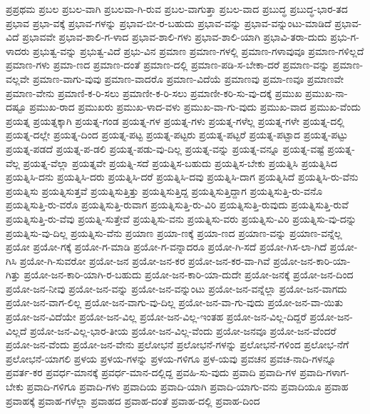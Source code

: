 {ಪ್ರಪ್ರಥಮ
ಪ್ರಬಲ
ಪ್ರಬಲ-ವಾಗಿ
ಪ್ರಬಲವಾ-ಗಿ-ರುವ
ಪ್ರಬಲ-ವಾಗುತ್ತಾ
ಪ್ರಬಲ-ವಾದ
ಪ್ರಬುದ್ಧ
ಪ್ರಬುದ್ಧ-ಭಾರ-ತದ
ಪ್ರಭಾವ
ಪ್ರಭಾ-ವಕ್ಕೆ
ಪ್ರಭಾವ-ಗಳನ್ನು
ಪ್ರಭಾವ-ಬೀ-ರ-ಬಹುದು
ಪ್ರಭಾವ-ವನ್ನು
ಪ್ರಭಾವ-ವನ್ನುಂಟು-ಮಾಡಿದೆ
ಪ್ರಭಾವ-ವಿದೆ
ಪ್ರಭಾವವೇ
ಪ್ರಭಾವ-ಶಾಲಿ-ಗ-ಳಾದ
ಪ್ರಭಾವ-ಶಾಲಿ-ಗಳು
ಪ್ರಭಾವ-ಶಾಲಿ-ಯಾಗಿ
ಪ್ರಭಾವಿ-ತರಾ-ದುದು
ಪ್ರಭು-ಗ-ಳಾದರು
ಪ್ರಭುತ್ವ-ವನ್ನು
ಪ್ರಭುತ್ವ-ವಿದೆ
ಪ್ರಭು-ವಿನ
ಪ್ರಮಾಣ
ಪ್ರಮಾಣ-ಗಳಲ್ಲಿ
ಪ್ರಮಾಣ-ಗಳಾವುವೂ
ಪ್ರಮಾಣ-ಗಳಿಲ್ಲದೆ
ಪ್ರಮಾಣ-ಗಳು
ಪ್ರಮಾ-ಣದ
ಪ್ರಮಾಣ-ದಂತೆ
ಪ್ರಮಾಣ-ದಲ್ಲಿ
ಪ್ರಮಾಣ-ಪಡಿ-ಸ-ಬೇಕಾ-ದರೆ
ಪ್ರಮಾಣ-ವನ್ನು
ಪ್ರಮಾಣ-ವಲ್ಲವೇ
ಪ್ರಮಾಣ-ವಾಗು-ವುವು
ಪ್ರಮಾಣ-ವಾದರೊ
ಪ್ರಮಾಣ-ವಿದೆಯೆ
ಪ್ರಮಾಣವು
ಪ್ರಮಾ-ಣವೂ
ಪ್ರಮಾಣವೇ
ಪ್ರಮಾಣ-ವೇನು
ಪ್ರಮಾಣಿ-ಕ-ರಿ-ಸಲು
ಪ್ರಮಾಣೀ-ಕ-ರಿ-ಸಲು
ಪ್ರಮಾಣೀ-ಕರಿ-ಸು-ವು-ದಕ್ಕೆ
ಪ್ರಮುಖ
ಪ್ರಮುಖ-ನಾ-ದಷ್ಟೂ
ಪ್ರಮುಖ-ರಾದ
ಪ್ರಮುಖರು
ಪ್ರಮುಖ-ಳಾದ-ವಳು
ಪ್ರಮುಖ-ವಾ-ಗು-ವುದು
ಪ್ರಮುಖ-ವಾದ
ಪ್ರಮುಖ-ವೆಂದು
ಪ್ರಯತ್ನ
ಪ್ರಯತ್ನಕ್ಕಾಗಿ
ಪ್ರಯತ್ನ-ಗಂಡ
ಪ್ರಯತ್ನ-ಗಳ
ಪ್ರಯತ್ನ-ಗಳು
ಪ್ರಯತ್ನ-ಗಳೆಲ್ಲ
ಪ್ರಯತ್ನ-ಗಳೇ
ಪ್ರಯತ್ನ-ದಲ್ಲಿ
ಪ್ರಯತ್ನ-ದಲ್ಲೇ
ಪ್ರಯತ್ನ-ದಿಂದ
ಪ್ರಯತ್ನ-ಪಟ್ಟ
ಪ್ರಯತ್ನ-ಪಟ್ಟರು
ಪ್ರಯತ್ನ-ಪಟ್ಟರೆ
ಪ್ರಯತ್ನ-ಪಟ್ಟಾದ
ಪ್ರಯತ್ನ-ಪಟ್ಟು
ಪ್ರಯತ್ನ-ಪಡದೆ
ಪ್ರಯತ್ನ-ಪ-ಡಲಿ
ಪ್ರಯತ್ನ-ಪಡು-ವು-ದಿಲ್ಲ
ಪ್ರಯತ್ನ-ವನ್ನು
ಪ್ರಯತ್ನ-ವನ್ನೂ
ಪ್ರಯತ್ನ-ವಷ್ಟೆ
ಪ್ರಯತ್ನ-ವೆಲ್ಲ
ಪ್ರಯತ್ನ-ವೆಲ್ಲಾ
ಪ್ರಯತ್ನವೇ
ಪ್ರಯತ್ನಿ-ಸದೆ
ಪ್ರಯತ್ನಿಸ-ಬಹುದು
ಪ್ರಯತ್ನಿಸ-ಬೇಕು
ಪ್ರಯತ್ನಿಸಿ
ಪ್ರಯತ್ನಿಸಿದ
ಪ್ರಯತ್ನಿಸಿ-ದನು
ಪ್ರಯತ್ನಿಸಿ-ದರು
ಪ್ರಯತ್ನಿಸಿ-ದರೆ
ಪ್ರಯತ್ನಿಸಿ-ದವು
ಪ್ರಯತ್ನಿಸಿ-ದಾಗ
ಪ್ರಯತ್ನಿಸಿದೆ
ಪ್ರಯತ್ನಿಸಿ-ರು-ವೆನು
ಪ್ರಯತ್ನಿಸು
ಪ್ರಯತ್ನಿಸುತ್ತವೆ
ಪ್ರಯತ್ನಿಸುತ್ತಿತ್ತು
ಪ್ರಯತ್ನಿಸುತ್ತಿದ್ದ
ಪ್ರಯತ್ನಿಸುತ್ತಿದ್ದಾಗ
ಪ್ರಯತ್ನಿಸುತ್ತಿ-ರು-ವನೊ
ಪ್ರಯತ್ನಿಸುತ್ತಿ-ರು-ವರೊ
ಪ್ರಯತ್ನಿಸುತ್ತಿ-ರುವಾಗ
ಪ್ರಯತ್ನಿಸುತ್ತಿ-ರು-ವಿರಿ
ಪ್ರಯತ್ನಿಸುತ್ತಿ-ರುವುದು
ಪ್ರಯತ್ನಿಸುತ್ತಿ-ರುವೆ
ಪ್ರಯತ್ನಿಸುತ್ತಿ-ರು-ವೆವು
ಪ್ರಯತ್ನಿ-ಸುತ್ತೇವೆ
ಪ್ರಯತ್ನಿಸು-ವನು
ಪ್ರಯತ್ನಿಸು-ವರು
ಪ್ರಯತ್ನಿಸು-ವಿರಿ
ಪ್ರಯತ್ನಿಸು-ವು-ದನ್ನು
ಪ್ರಯತ್ನಿಸು-ವು-ದಿಲ್ಲ
ಪ್ರಯತ್ನಿಸು-ವೆನು
ಪ್ರಯಾಣ
ಪ್ರಯಾ-ಣಕ್ಕೆ
ಪ್ರಯಾ-ಣದ
ಪ್ರಯಾಣ-ವನ್ನು
ಪ್ರಯಾಣ-ವನ್ನೆಲ್ಲ
ಪ್ರಯೋ
ಪ್ರಯೋ-ಗಕ್ಕೆ
ಪ್ರಯೋ-ಗ-ಮಾಡಿ
ಪ್ರಯೋ-ಗ-ವನ್ನಾದರೂ
ಪ್ರಯೋ-ಗಿ-ಸದೆ
ಪ್ರಯೋ-ಗಿಸ-ಲಾ-ಗಿದೆ
ಪ್ರಯೋ-ಗಿಸಿ
ಪ್ರಯೋ-ಗಿ-ಸುವರೋ
ಪ್ರಯೋ-ಜನ
ಪ್ರಯೋ-ಜನ-ಕರ
ಪ್ರಯೋ-ಜನ-ಕರ-ವಾ-ಗಿವೆ
ಪ್ರಯೋ-ಜನ-ಕಾರಿ-ಯಾ-ಗಿತ್ತು
ಪ್ರಯೋ-ಜನ-ಕಾರಿ-ಯಾಗಿ-ರ-ಬಹುದು
ಪ್ರಯೋ-ಜನ-ಕಾರಿ-ಯಾ-ದುದೇ
ಪ್ರಯೋ-ಜನಕ್ಕೆ
ಪ್ರಯೋ-ಜನ-ದಿಂದ
ಪ್ರಯೋ-ಜನ-ನೀವು
ಪ್ರಯೋ-ಜನ-ವನ್ನು
ಪ್ರಯೋ-ಜನ-ವನ್ನುಂಟು
ಪ್ರಯೋ-ಜನ-ವನ್ನೆಲ್ಲಾ
ಪ್ರಯೋ-ಜನ-ವಾಗದು
ಪ್ರಯೋ-ಜನ-ವಾಗ-ಲಿಲ್ಲ
ಪ್ರಯೋ-ಜನ-ವಾಗು-ವು-ದಿಲ್ಲ
ಪ್ರಯೋ-ಜನ-ವಾ-ಗು-ವುದು
ಪ್ರಯೋ-ಜನ-ವಾ-ಯಿತು
ಪ್ರಯೋ-ಜನ-ವಿದೆಯೇ
ಪ್ರಯೋ-ಜನ-ವಿಲ್ಲ
ಪ್ರಯೋ-ಜನ-ವಿಲ್ಲ-ಇಂತಹ
ಪ್ರಯೋ-ಜನ-ವಿಲ್ಲ-ದಿದ್ದರೆ
ಪ್ರಯೋ-ಜನ-ವಿಲ್ಲದೆ
ಪ್ರಯೋ-ಜನ-ವಿಲ್ಲ-ಭಾರ-ತೀಯ
ಪ್ರಯೋ-ಜನ-ವಿಲ್ಲ-ವೆಂದು
ಪ್ರಯೋ-ಜನವೂ
ಪ್ರಯೋ-ಜನ-ವೆಂದರೆ
ಪ್ರಯೋ-ಜನ-ವೆಂದು
ಪ್ರಯೋ-ಜನ-ವೇನು
ಪ್ರಲೋಭನೆ
ಪ್ರಲೋಭನೆ-ಗಳನ್ನು
ಪ್ರಲೋಭನೆ-ಗಳಿಂದ
ಪ್ರಲೋಭ-ನೆಗೆ
ಪ್ರಲೋಭನೆ-ಯಾಗಲಿ
ಪ್ರಳಯ
ಪ್ರಳಯ-ಗಳನ್ನು
ಪ್ರಳಯ-ಗಳಿಗೂ
ಪ್ರಳ-ಯವು
ಪ್ರವಚನ
ಪ್ರವಚ-ನಾದಿ-ಗಳನ್ನೂ
ಪ್ರವರ್ತ-ಕರ
ಪ್ರವರ್ಧ-ಮಾನಕ್ಕೆ
ಪ್ರವರ್ಧ-ಮಾನ-ದಲ್ಲಿದ್ದ
ಪ್ರವಹಿ-ಸು-ವುದು
ಪ್ರವಾದಿ
ಪ್ರವಾದಿ-ಗಳ
ಪ್ರವಾದಿ-ಗಳಾಗ-ಬೇಕು
ಪ್ರವಾದಿ-ಗಳಿಗೂ
ಪ್ರವಾದಿ-ಗಳು
ಪ್ರವಾದಿಯ
ಪ್ರವಾದಿ-ಯಾಗಿ
ಪ್ರವಾದಿ-ಯಾಗು-ವನು
ಪ್ರವಾದಿಯೂ
ಪ್ರವಾಹ
ಪ್ರವಾಹಕ್ಕೆ
ಪ್ರವಾಹ-ಗಳೆಲ್ಲಾ
ಪ್ರವಾಹದ
ಪ್ರವಾಹ-ದಂತೆ
ಪ್ರವಾಹ-ದಲ್ಲಿ
ಪ್ರವಾಹ-ದಿಂದ
}
